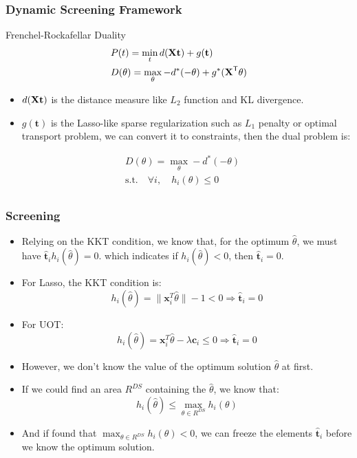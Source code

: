 \documentclass[dvipdfmx,cjk,t,10pt]{beamer}
\newcommand{\tranT}{\mathsf T}
\renewcommand{\vec}[1]{\mathbf{#1}}
\begin{document}
\begin{frame}
\frametitle{Dynamic Screening Framework}
	\begin{screen}{Frenchel-Rockafellar Duality \cite{NEURIPS2021_7b5b23f4}}
\begin{equation}
\begin{split}
	&P(t) = \min_{t} d(\mat{X}\vec{t}) + g(\vec{t})\\
	&D(\theta) = \max_{\theta} -d^{*}(-\theta) + g^{*}(\mat{X}^{\tranT}\theta)
\end{split}
\end{equation}
	\end{screen}	
		\begin{itemize}
		\item $d(\mat{X}\vec{t})$ is the distance measure like $L_2$ function and KL divergence.
		\item $g(\vec{t})$ is the Lasso-like sparse regularization such as $L_1$ penalty or optimal transport problem, we can convert it to constraints, then the dual problem is:  
	\end{itemize}
			$$
	\begin{aligned}
			&D(\theta) =  \max_{\theta}-d^{*}(-\theta)\\
			&\text{s.t.}\quad \forall i,\quad  h_{i}(\theta)\leq 0\\  
	\end{aligned}
		$$
\end{frame}

\begin{frame}
\frametitle{Screening}	
		\begin{itemize}
		 \item Relying on the KKT condition, we know that, for the optimum $\hat{\theta}$, we must have $\vec{\hat{t}}_i h_{i}(\hat{\theta})=0$. which indicates if $h_{i}(\hat{\theta})<0$, then $\vec{\hat{t}}_i=0$. 
		 \item For Lasso, the KKT condition is: 
		$$
		{h_{i}(\hat{\theta})=\|\vec{x}_i^{T}\hat{\theta}\| - 1 < 0}  \Rightarrow \vec{\hat{t}}_i = 0
		$$
		\item For UOT: 
		$$
		{h_{i}(\hat{\theta})=\vec{x}_i^{T}\hat{\theta} -\lambda \vec{c}_i \leq 0}  \Rightarrow \vec{\hat{t}}_i = 0
		$$
		\item However, we don't know the value of the optimum solution $\hat{\theta}$ at first.
		\item If we could find an area $R^{DS}$ containing the $\hat{\theta}$, we know that:
		$$
		h_{i}(\hat{\theta}) \leq \max_{\theta \in R^{DS}}h_{i}(\theta) 
		$$
		\item And if found that $ \max_{\theta \in R^{DS}}h_{i}(\theta) <0$, we can freeze the elements $\vec{\hat{t}}_i$ before we know the optimum solution.
		\end{itemize}
\end{frame}
\end{document}
